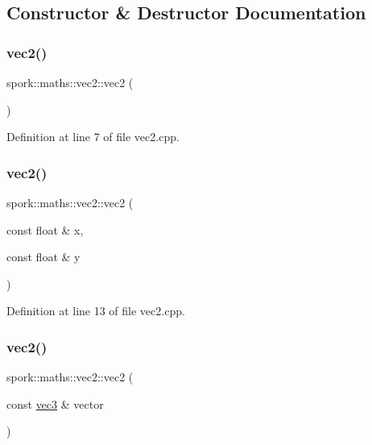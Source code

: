 \subsection{Constructor \& Destructor Documentation}
\mbox{\label{structspork_1_1maths_1_1vec2_a5d5b62cb2ba5a5234c0f4e5f122f94da}} 
\subsubsection{\texorpdfstring{vec2()}{vec2()}\hspace{0.1cm}{\footnotesize\ttfamily [1/3]}}
{\footnotesize\ttfamily spork\+::maths\+::vec2\+::vec2 (\begin{DoxyParamCaption}{ }\end{DoxyParamCaption})}



Definition at line 7 of file vec2.\+cpp.

\mbox{\label{structspork_1_1maths_1_1vec2_adb68c59e392ee34362cbe8cf6a710a24}} 
\subsubsection{\texorpdfstring{vec2()}{vec2()}\hspace{0.1cm}{\footnotesize\ttfamily [2/3]}}
{\footnotesize\ttfamily spork\+::maths\+::vec2\+::vec2 (\begin{DoxyParamCaption}\item[{const float \&}]{x,  }\item[{const float \&}]{y }\end{DoxyParamCaption})}



Definition at line 13 of file vec2.\+cpp.

\mbox{\label{structspork_1_1maths_1_1vec2_af24f57ecb7df42f271aeac5464b5777f}} 
\subsubsection{\texorpdfstring{vec2()}{vec2()}\hspace{0.1cm}{\footnotesize\ttfamily [3/3]}}
{\footnotesize\ttfamily spork\+::maths\+::vec2\+::vec2 (\begin{DoxyParamCaption}\item[{const \hyperlink{structspork_1_1maths_1_1vec3}{vec3} \&}]{vector }\end{DoxyParamCaption})}



